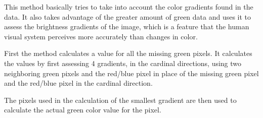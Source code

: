 This method basically tries to take into account the color gradients found in
the data. It also takes advantage of the greater amount of green data and uses
it to assess the brightness gradients of the image, which is a feature that the
human visual system perceives more accurately than changes in color.

First the method calculates a value for all the missing green pixels. It
calculates the values by first assessing 4 gradients, in the cardinal
directions, using two neighboring green pixels and the red/blue pixel in place
of the missing green pixel and the red/blue pixel in the cardinal direction.

The pixels used in the calculation of the smallest gradient are then used to
calculate the actual green color value for the pixel.
